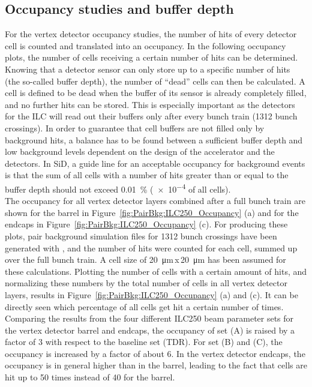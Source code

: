 \subsection{Occupancy studies and buffer depth}
\label{PairBkg:occupancy}
For the vertex detector occupancy studies, the number of hits of every detector cell is counted and translated into an occupancy.
In the following occupancy plots, the number of cells receiving a certain number of hits can be determined.
Knowing that a detector sensor can only store up to a specific number of hits (the so-called buffer depth), the number of ``dead'' cells can then be calculated.
A cell is defined to be dead when the buffer of its sensor is already completely filled, and no further hits can be stored.
This is especially important as the detectors for the ILC will read out their buffers only after every bunch train (1312 bunch crossings).
In order to guarantee that cell buffers are not filled only by background hits, a balance has to be found between a sufficient buffer depth and low background levels dependent on the design of the accelerator and the detectors.
In SiD, a guide line for an acceptable occupancy for background events is that the sum of all cells with a number of hits greater than or equal to the buffer depth should not exceed \SI{0.01}{\percent} (\num{e-4} of all cells). 
\\The occupancy for all vertex detector layers combined after a full bunch train are shown for the barrel in Figure~\ref{fig:PairBkg:ILC250_Occupancy} (a) and for the endcaps in Figure~\ref{fig:PairBkg:ILC250_Occupancy} (c).
For producing these plots, pair background simulation files for 1312 bunch crossings have been generated with \guineapig, and the number of hits were counted for each cell, summed up over the full bunch train.
A cell size of \SI{20}{\micro\meter}\,x\,\SI{20}{\micro\meter} has been assumed for these calculations.
Plotting the number of cells with a certain amount of hits, and normalizing these numbers by the total number of cells in all vertex detector layers, results in Figure~\ref{fig:PairBkg:ILC250_Occupancy} (a) and (c).
It can be directly seen which percentage of all cells get hit a certain number of times.
Comparing the results from the four different ILC250 beam parameter sets for the vertex detector barrel and endcaps, the occupancy of set (A) is raised by a factor of 3 with respect to the baseline set (TDR).
For set (B) and (C), the occupancy is increased by a factor of about 6.
In the vertex detector endcaps, the occupancy is in general higher than in the barrel, leading to the fact that cells are hit up to 50 times instead of 40 for the barrel.
